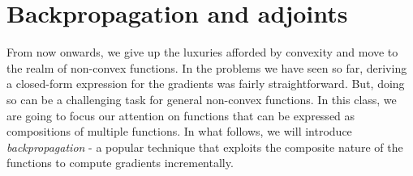 \documentclass[12pt]{article}
\begin{document}
\maketitle



\section{Backpropagation and adjoints}
 From now onwards, we give up the luxuries afforded by convexity and move to the realm of non-convex functions. In the problems we have seen so far, deriving a closed-form expression for the gradients was fairly straightforward. But, doing so can be a challenging task for general non-convex functions. In this class, we are going to focus our attention on functions that can be expressed as compositions of multiple functions. In what follows, we will introduce \textit{backpropagation} - a popular technique that exploits the composite nature of the functions to compute gradients incrementally. 
\end{document}

